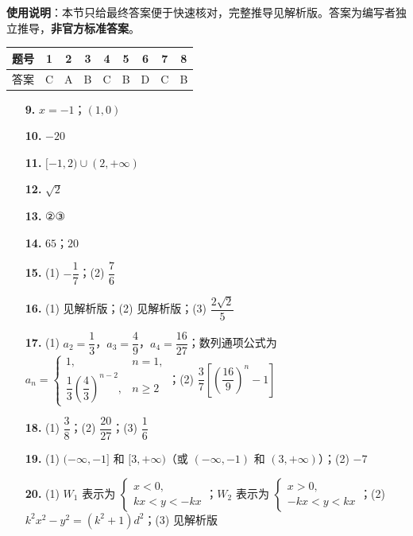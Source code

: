 
\begin{gknotice}
\textbf{使用说明}：本节只给最终答案便于快速核对，完整推导见解析版。答案为编写者独立推导，\textbf{非官方标准答案}。
\end{gknotice}

\begin{center}\begin{tabular}{ccccccccc}
\toprule
题号 & 1 & 2 & 3 & 4 & 5 & 6 & 7 & 8 \\
\midrule
答案 & C & A & B & C & B & D & C & B \\
\bottomrule
\end{tabular}\end{center}

\begin{itemize}[leftmargin=2.6em]
  \item[\textbf{9.}] $x = -1$；$(1, 0)$
  \item[\textbf{10.}] $-20$
  \item[\textbf{11.}] $[-1, 2) \cup (2, +\infty)$
  \item[\textbf{12.}] $\sqrt{2}$
  \item[\textbf{13.}] ②③
  \item[\textbf{14.}] $65$；$20$
\end{itemize}

\begin{itemize}[leftmargin=2.6em]
  \item[\textbf{15.}] (1) $-\dfrac{1}{7}$；(2) $\dfrac{7}{6}$
  \item[\textbf{16.}] (1) 见解析版；(2) 见解析版；(3) $\dfrac{2\sqrt{2}}{5}$
  \item[\textbf{17.}] (1) $a_2 = \dfrac{1}{3}$，$a_3 = \dfrac{4}{9}$，$a_4 = \dfrac{16}{27}$；数列通项公式为 $a_n = \begin{cases} 1, & n = 1, \\ \dfrac{1}{3}\left(\dfrac{4}{3}\right)^{n-2}, & n \geqslant 2 \end{cases}$；(2) $\dfrac{3}{7}\left[\left(\dfrac{16}{9}\right)^n - 1\right]$
  \item[\textbf{18.}] (1) $\dfrac{3}{8}$；(2) $\dfrac{20}{27}$；(3) $\dfrac{1}{6}$
  \item[\textbf{19.}] (1) $(-\infty, -1]$ 和 $[3, +\infty)$（或 $(-\infty, -1)$ 和 $(3, +\infty)$）；(2) $-7$
  \item[\textbf{20.}] (1) $W_1$ 表示为 $\begin{cases} x < 0, \\ kx < y < -kx \end{cases}$；$W_2$ 表示为 $\begin{cases} x > 0, \\ -kx < y < kx \end{cases}$；(2) $k^2 x^2 - y^2 = (k^2 + 1)d^2$；(3) 见解析版
\end{itemize}
